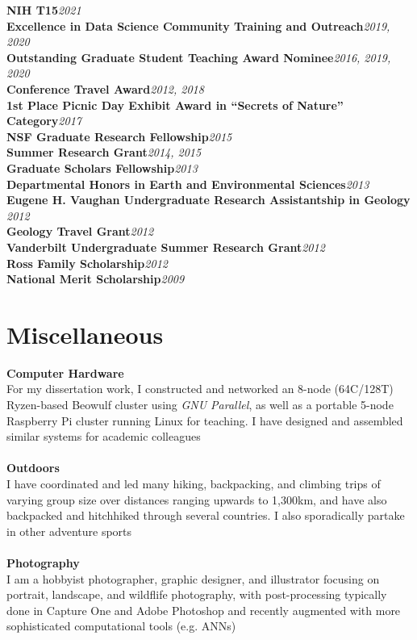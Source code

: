 \documentclass[12pt]{article}
\begin{document}
\textbf{NIH T15}\hfill \emph{2021}\\
\textbf{Excellence in Data Science Community Training and Outreach}\hfill \emph{2019, 2020}\\
\textbf{Outstanding Graduate Student Teaching Award Nominee}\hfill \emph{2016, 2019, 2020}\\
\textbf{Conference Travel Award}\hfill \emph{2012, 2018}\\
\textbf{1st Place Picnic Day Exhibit Award in “Secrets of Nature” Category}\hfill \emph{2017}\\
\textbf{NSF Graduate Research Fellowship}\hfill \emph{2015}\\
\textbf{Summer Research Grant}\hfill \emph{2014, 2015}\\
\textbf{Graduate Scholars Fellowship}\hfill \emph{2013}\\
\textbf{Departmental Honors in Earth and Environmental Sciences}\hfill \emph{2013}\\
\textbf{Eugene H. Vaughan Undergraduate Research Assistantship in Geology }\hfill \emph{2012}\\
\textbf{Geology Travel Grant}\hfill \emph{2012}\\
\textbf{Vanderbilt Undergraduate Summer Research Grant}\hfill \emph{2012}\\
\textbf{Ross Family Scholarship}\hfill \emph{2012}\\
\textbf{National Merit Scholarship}\hfill \emph{2009}\\


\vspace{-0.35em}

\section{Miscellaneous}
\textbf{Computer Hardware}\\For my dissertation work, I constructed and networked an 8-node (64C/128T) Ryzen-based Beowulf cluster using \emph{GNU Parallel}, as well as a portable 5-node Raspberry Pi cluster running Linux for teaching. I have designed and assembled similar systems for academic colleagues\\\\
\textbf{Outdoors}\\ I have coordinated and led many hiking, backpacking, and climbing trips of varying group size over distances ranging upwards to 1,300km, and have also backpacked and hitchhiked through several countries. I also sporadically partake in other adventure sports\\\\
\textbf{Photography}\\ I am a hobbyist photographer, graphic designer, and illustrator focusing on portrait, landscape, and wildflife photography, with post-processing typically done in Capture One and Adobe Photoshop and recently augmented with more sophisticated computational tools (e.g. ANNs)\\
\end{document}
